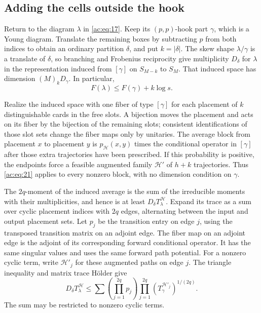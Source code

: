 \subsection{Adding the cells outside the hook}
\label{ac:part:245}

Return to the diagram \(\lambda\) in \eqref{ac:eq:17}. Keep its
\((p,p)\)-hook part \(\gamma\), which is a Young diagram. Translate the
remaining boxes by subtracting \(p\) from both indices to obtain an
ordinary partition \(\delta\), and put \(k=|\delta|\). The skew shape
\(\lambda/\gamma\) is a translate of \(\delta\), so branching and
Frobenius reciprocity give multiplicity \(D_\delta\) for \(\lambda\) in the representation
induced from \([\gamma]\) on \(S_{M-k}\) to \(S_M\). That induced space has
dimension \((M)_kD_\gamma\). In particular,
\begin{equation}
 F(\lambda)\le F(\gamma)+k\log s.
 \label{ac:eq:22}
\end{equation}

Realize the induced space with one fiber of type \([\gamma]\) for each
placement of \(k\) distinguishable cards in the free slots. A bijection
moves the placement and acts on its fiber by the bijection of the
remaining slots; consistent identifications of those slot sets change
the fiber maps only by unitaries. The average block from placement \(x\)
to placement \(y\) is \(p_{\mathcal H}(x,y)\) times the conditional
operator in \([\gamma]\) after those extra trajectories have been
prescribed. If this probability is positive, the endpoints force a
feasible augmented family \(\mathcal H'\) of \(h+k\) trajectories.
Thus \eqref{ac:eq:21} applies to every nonzero block, with no dimension
condition on \(\gamma\).

The \(2q\)-moment of the induced average is the sum of the irreducible
moments with their multiplicities, and hence is at least
\(D_\delta T_\lambda^{\mathcal H}\). Expand its trace as a sum over
cyclic placement indices with \(2q\) edges, alternating between the
input and output placement sets. Let \(p_j\) be the transition entry on
edge \(j\), using the transposed transition matrix on an adjoint edge.
The fiber map on an adjoint edge is the adjoint of its corresponding
forward conditional operator. It has the same singular values and uses
the same forward path potential. For a nonzero cyclic term, write
\(\mathcal H'_j\) for these augmented paths on edge \(j\).
The triangle inequality and matrix trace H\"older give
\begin{equation}
 D_\delta T_\lambda^{\mathcal H}
 \le \sum
 \left(\prod_{j=1}^{2q}p_j\right)
 \prod_{j=1}^{2q}(T_\gamma^{\mathcal H'_j})^{1/(2q)}.
 \label{ac:eq:23}
\end{equation}
The sum may be restricted to nonzero cyclic terms.

